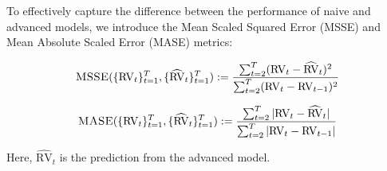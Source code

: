 To effectively capture the difference between the performance of naive and advanced models, we introduce the Mean Scaled Squared Error (MSSE) and Mean Absolute Scaled Error (MASE) metrics:

\begin{equation}
    \textsc{MSSE}(\{\text{RV}_t\}_{t=1}^T, \{\widehat{\text{RV}}_t\}_{t=1}^T) := \frac{\sum_{t=2}^T (\text{RV}_t - \widehat{\text{RV}}_t)^2}{\sum_{t=2}^T (\text{RV}_t - \text{RV}_{t-1})^2}
\end{equation}

\begin{equation}
    \textsc{MASE}(\{\text{RV}_t\}_{t=1}^T, \{\widehat{\text{RV}}_t\}_{t=1}^T) := \frac{\sum_{t=2}^T |\text{RV}_t - \widehat{\text{RV}}_t|}{\sum_{t=2}^T |\text{RV}_t - \text{RV}_{t-1}|}
\end{equation}

Here, \(\widehat{\text{RV}}_t\) is the prediction from the advanced model.



% 
